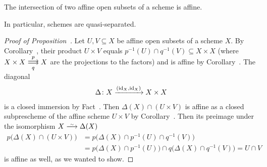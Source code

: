 \documentclass[a4paper,parskip=half,numbers=enddot, DIV=12]{scrreprt}
\begin{document}
\begin{prop}
    The intersection of two affine open subsets of a scheme is affine.
\end{prop}
\begin{rem*}
    In particular, schemes are quasi-separated.
\end{rem*}
\begin{proof}[Proof of Proposition~]
    Let $U,V\subseteq X$ be affine open subsets of a scheme $X$. By Corollary~, their product $U\times V$ equals $p^{-1}(U) \cap q^{-1} (V)\subseteq X\times X$ (where $X\times X\doublemorphism[p][q] X$ are the projections to the factors) and is affine by Corollary~. The diagonal 
    \begin{align*}
    	\Delta\colon X\xrightarrow{(\operatorname{id}_X,\operatorname{id}_X)}X\times X
    \end{align*}
     is a closed immersion by Fact~. Then $\Delta(X)\cap (U\times V)$ is affine as a closed subprescheme of the affine scheme $U\times V$ by Corollary~. Then its preimage under the isomorphism $X\isomorphism\Delta(X)$
    \begin{align*}
    	p\big(\Delta(X)\cap (U\times V)\big)&=p\big(\Delta(X)\cap p^{-1}(U)\cap q^{-1}(V)\big)\\
    	&=p\big(\Delta(X)\cap p^{-1}(U)\big)\cap q\big(\Delta(X)\cap q^{-1}(V)\big)=U\cap V
    \end{align*}
     is affine as well, as we wanted to show.
\end{proof}
\end{document}
